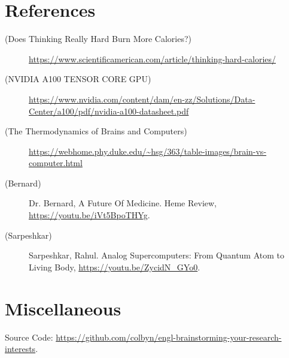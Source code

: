 \newpage
\section*{References}

\newcommand{\source}[2]{
\item [({#1})]{#2}
}

\begin{description}
\source{Does Thinking Really Hard Burn More Calories?}{\url{https://www.scientificamerican.com/article/thinking-hard-calories/}}
\source{NVIDIA A100
TENSOR CORE GPU}{\url{https://www.nvidia.com/content/dam/en-zz/Solutions/Data-Center/a100/pdf/nvidia-a100-datasheet.pdf}}
\source{The Thermodynamics of Brains and Computers}{\url{https://webhome.phy.duke.edu/~hsg/363/table-images/brain-vs-computer.html}}
\source{Bernard}{Dr. Bernard, A Future Of Medicine. Heme Review, \url{https://youtu.be/iVt5BpoTHYg}.}
\source{Sarpeshkar}{Sarpeshkar, Rahul. Analog Supercomputers: From Quantum Atom to Living Body, \url{https://youtu.be/ZycidN_GYo0}.}
\end{description}

\section*{Miscellaneous}
\begin{center}
    Source Code: \url{https://github.com/colbyn/engl-brainstorming-your-research-interests}.
\end{center}

